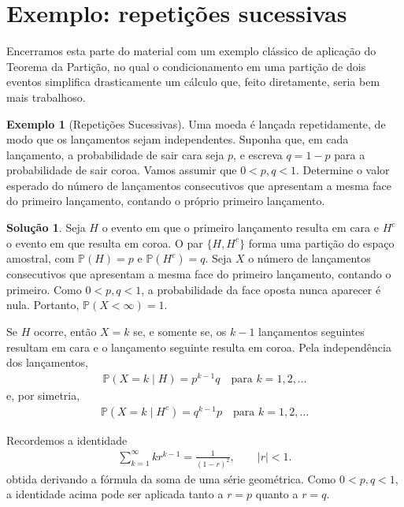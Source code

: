 \documentclass[12pt,portuguese]{article}
\theoremstyle{definition}
\newtheorem{example}[example]{Exemplo}
\newtheorem*{solution}{Solução}
\begin{document}
\section{Exemplo: repetições sucessivas}
\label{sec:corrida-inicial}

Encerramos esta parte do material com um exemplo clássico de aplicação do
Teorema da Partição, no qual o condicionamento em uma partição de dois
eventos simplifica drasticamente um cálculo que, feito diretamente, seria
bem mais trabalhoso.

\begin{example}[Repetições Sucessivas]\label{ex:corrida-inicial}
Uma moeda é lançada repetidamente, de modo que os lançamentos sejam independentes. 
Suponha que, em cada lançamento, a probabilidade de sair cara seja \(p\), e escreva
\(q = 1-p\) para a probabilidade de sair coroa. Vamos assumir que \(0 < p,q < 1\).
Determine o valor esperado do número de lançamentos consecutivos que apresentam a
mesma face do primeiro lançamento, contando o próprio primeiro lançamento.

\begin{solution}
Seja \(H\) o evento em que o primeiro lançamento resulta em cara e \(H^c\)
o evento em que resulta em coroa. O par \(\{H, H^c\}\) forma uma partição
do espaço amostral, com \(\mathbb{P}(H)=p\) e
\(\mathbb{P}(H^c)=q\). Seja \(X\) o número de lançamentos consecutivos
que apresentam a mesma face do primeiro lançamento, contando o primeiro.
Como \(0<p,q<1\), a probabilidade da face oposta nunca aparecer é nula.
Portanto, $\mathbb{P}(X<\infty)=1$.

Se \(H\) ocorre, então \(X = k\) se, e somente se, os \(k-1\) lançamentos
seguintes resultam em cara e o lançamento seguinte resulta em coroa. Pela
independência dos lançamentos,
\begin{align}\label{eq-aux1-ex-corrida}
\mathbb{P}(X = k \mid H) = p^{k-1} q \quad \text{para } k = 1, 2, \ldots
\end{align}
e, por simetria,
\begin{align}\label{eq-aux2-ex-corrida}
\mathbb{P}(X = k \mid H^c) = q^{k-1} p \quad \text{para } k = 1, 2, \ldots
\end{align}

Recordemos a identidade
\begin{align}\label{eq-aux3-ex-corrida}
\sum_{k=1}^{\infty} k r^{k-1} = \frac{1}{(1-r)^2},
\qquad \lvert r\rvert<1.
\end{align}
obtida derivando a fórmula da soma de uma série geométrica. Como
\(0<p,q<1\), a identidade acima pode ser aplicada tanto a \(r=p\) quanto a \(r=q\).


\end{solution}
\end{example}
\end{document}
